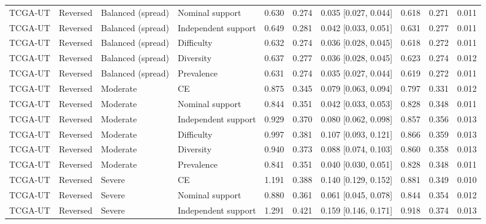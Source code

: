 \begin{longtable}{llllllllll}
TCGA-UT & Reversed & Balanced (spread) & Nominal support & 0.630 & 0.274 & 0.035 [0.027, 0.044] & 0.618 & 0.271 & 0.011 \\
TCGA-UT & Reversed & Balanced (spread) & Independent support & 0.649 & 0.281 & 0.042 [0.033, 0.051] & 0.631 & 0.277 & 0.011 \\
TCGA-UT & Reversed & Balanced (spread) & Difficulty & 0.632 & 0.274 & 0.036 [0.028, 0.045] & 0.618 & 0.272 & 0.011 \\
TCGA-UT & Reversed & Balanced (spread) & Diversity & 0.637 & 0.277 & 0.036 [0.028, 0.045] & 0.623 & 0.274 & 0.012 \\
TCGA-UT & Reversed & Balanced (spread) & Prevalence & 0.631 & 0.274 & 0.035 [0.027, 0.044] & 0.619 & 0.272 & 0.011 \\
TCGA-UT & Reversed & Moderate & CE & 0.875 & 0.345 & 0.079 [0.063, 0.094] & 0.797 & 0.331 & 0.012 \\
TCGA-UT & Reversed & Moderate & Nominal support & 0.844 & 0.351 & 0.042 [0.033, 0.053] & 0.828 & 0.348 & 0.011 \\
TCGA-UT & Reversed & Moderate & Independent support & 0.929 & 0.370 & 0.080 [0.062, 0.098] & 0.857 & 0.356 & 0.013 \\
TCGA-UT & Reversed & Moderate & Difficulty & 0.997 & 0.381 & 0.107 [0.093, 0.121] & 0.866 & 0.359 & 0.013 \\
TCGA-UT & Reversed & Moderate & Diversity & 0.940 & 0.373 & 0.088 [0.074, 0.103] & 0.860 & 0.358 & 0.013 \\
TCGA-UT & Reversed & Moderate & Prevalence & 0.841 & 0.351 & 0.040 [0.030, 0.051] & 0.828 & 0.348 & 0.011 \\
TCGA-UT & Reversed & Severe & CE & 1.191 & 0.388 & 0.140 [0.129, 0.152] & 0.881 & 0.349 & 0.010 \\
TCGA-UT & Reversed & Severe & Nominal support & 0.880 & 0.361 & 0.061 [0.045, 0.078] & 0.844 & 0.354 & 0.012 \\
TCGA-UT & Reversed & Severe & Independent support & 1.291 & 0.421 & 0.159 [0.146, 0.171] & 0.918 & 0.374 & 0.013 \\
\end{longtable}
